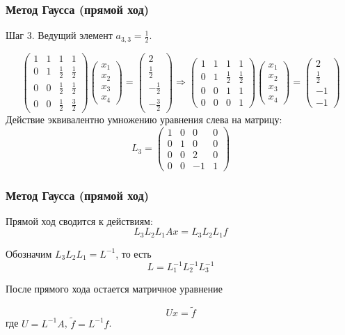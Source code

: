 \documentclass[10pt]{beamer}
\begin{document}
\begin{frame}[fragile]
\frametitle{Метод Гаусса (прямой ход)}

Шаг 3. Ведущий элемент $a_{3,3} = \frac{1}{2}$.

$$
\begin{pmatrix}
1 & 1 & 1 & 1 \\
0 & 1 & \frac{1}{2} & \frac{1}{2} \\
0 & 0 & \frac{1}{2} & \frac{1}{2} \\
0 & 0 & \frac{1}{2} & \frac{3}{2} 
\end{pmatrix}
\begin{pmatrix}
x_1 \\
x_2 \\
x_3 \\
x_4
\end{pmatrix}
=
\begin{pmatrix}
2 \\
\frac{1}{2} \\
-\frac{1}{2} \\
-\frac{3}{2}
\end{pmatrix}
\Rightarrow
\begin{pmatrix}
1 & 1 & 1 & 1 \\
0 & 1 & \frac{1}{2} & \frac{1}{2} \\
0 & 0 & 1 & 1 \\
0 & 0 & 0 & 1 
\end{pmatrix}
\begin{pmatrix}
x_1 \\
x_2 \\
x_3 \\
x_4
\end{pmatrix}
=
\begin{pmatrix}
2 \\
\frac{1}{2} \\
-1 \\
-1
\end{pmatrix}
$$
Действие эквивалентно умножению уравнения слева на матрицу:
$$
L_3 = 
\begin{pmatrix}
1 & 0 & 0 & 0 \\
0 & 1 & 0 & 0 \\
0 & 0 & 2 & 0 \\
0 & 0 & -1 & 1 
\end{pmatrix}
$$
\end{frame}

\begin{frame}[fragile]
\frametitle{Метод Гаусса (прямой ход)}
Прямой ход сводится к действиям:
$$
L_3 L_2 L_1 A x = L_3 L_2 L_1 f
$$

Обозначим $L_3 L_2 L_1 = L^{-1}$, то есть 
$$ L = L_1^{-1} L_2^{-1} L_3^{-1}$$

После прямого хода остается матричное уравнение

$$U x = \tilde{f}$$
где $U = L^{-1} A$, $\tilde{f} = L^{-1} f$.
\end{frame}
\end{document}
